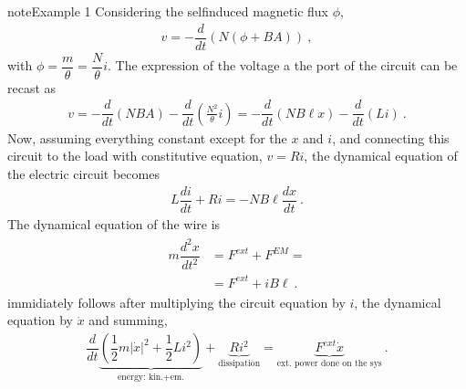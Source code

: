 \documentclass[letterpaper,10pt,italian]{jupyterBook}
\begin{document}
\begin{sphinxadmonition}{note}{Example 1}
\sphinxAtStartPar
{} Considering the self\sphinxhyphen{}induced magnetic flux \(\phi\),
\begin{equation*}
\begin{split}v = - \dfrac{d}{dt} \left( N \left( \phi + B A \right) \right) \ ,\end{split}
\end{equation*}
\sphinxAtStartPar
with \(\phi = \dfrac{m}{\theta} = \dfrac{N}{\theta} i\). The expression of the voltage a the port of the circuit can be recast as
\begin{equation*}
\begin{split}v = - \dfrac{d}{dt} \left( N B A \right) - \dfrac{d}{dt} \left( \frac{N^2}{\theta} i \right) = - \dfrac{d}{dt} \left( N B \ell x \right) - \dfrac{d}{dt} \left( L i \right) \ .\end{split}
\end{equation*}
\sphinxAtStartPar
Now, assuming everything constant except for the \(x\) and \(i\), and connecting this circuit to the load with constitutive equation, \(v = R i\), the dynamical equation of the electric circuit becomes
\begin{equation*}
\begin{split}L \dfrac{d i}{d t} + R i = - N B \ell \dfrac{d x}{d t} \ .\end{split}
\end{equation*}
\sphinxAtStartPar
The dynamical equation of the wire is
\begin{equation*}
\begin{split}\begin{aligned}
 m \dfrac{d^2 x}{d t^2} 
 & = F^{ext} + F^{EM} = \\
 & = F^{ext} + i B \ell \ .
\end{aligned}\end{split}
\end{equation*}
\sphinxAtStartPar
{} immidiately follows after multiplying the circuit equation by \(i\), the dynamical equation by \(\dot{x}\) and summing,
\begin{equation*}
\begin{split}\dfrac{d}{dt} \underbrace{\left( \dfrac{1}{2} m |\dot{x}|^2 + \dfrac{1}{2} L i^2 \right)}_{\text{energy: kin.+em.}} + \underbrace{R i^2}_{\text{dissipation}} = \underbrace{F^{ext} \dot{x}}_{\text{ext. power done on the sys}} \ .\end{split}
\end{equation*}\end{sphinxadmonition}
\end{document}
